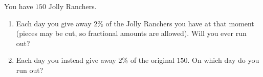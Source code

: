 You have $150$ Jolly Ranchers.
\begin{enumerate}
\item[(a)] Each day you give away $2\%$ of the Jolly Ranchers you have at that moment (pieces may be cut, so fractional amounts are allowed). Will you ever run out?
\item[(b)] Each day you instead give away $2\%$ of the original $150$. On which day do you run out?
\end{enumerate}
